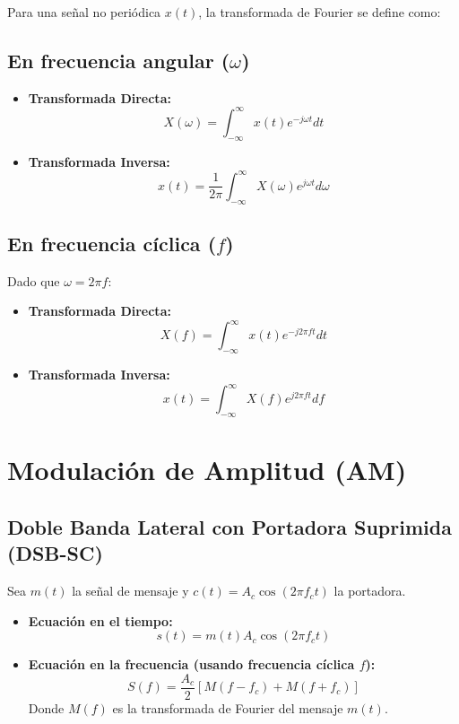 \documentclass{article}
\begin{document}
Para una señal no periódica $x(t)$, la transformada de Fourier se define como:

\subsection{En frecuencia angular ($\omega$)}
\begin{itemize}
      \item \textbf{Transformada Directa:}
            \[ X(\omega) = \int_{-\infty}^{\infty} x(t) e^{-j\omega t} dt \]
      \item \textbf{Transformada Inversa:}
            \[ x(t) = \frac{1}{2\pi} \int_{-\infty}^{\infty} X(\omega) e^{j\omega t} d\omega \]
\end{itemize}

\subsection{En frecuencia cíclica ($f$)}
Dado que $\omega = 2\pi f$:
\begin{itemize}
      \item \textbf{Transformada Directa:}
            \[ X(f) = \int_{-\infty}^{\infty} x(t) e^{-j2\pi f t} dt \]
      \item \textbf{Transformada Inversa:}
            \[ x(t) = \int_{-\infty}^{\infty} X(f) e^{j2\pi f t} df \]
\end{itemize}

\section{Modulación de Amplitud (AM)}

\subsection{Doble Banda Lateral con Portadora Suprimida (DSB-SC)}

Sea $m(t)$ la señal de mensaje y $c(t) = A_c \cos(2\pi f_c t)$ la portadora.

\begin{itemize}
      \item \textbf{Ecuación en el tiempo:}
            \[ s(t) = m(t) A_c \cos(2\pi f_c t) \]
            
      \item \textbf{Ecuación en la frecuencia (usando frecuencia cíclica $f$):}
            \[ S(f) = \frac{A_c}{2} [M(f - f_c) + M(f + f_c)] \]
            Donde $M(f)$ es la transformada de Fourier del mensaje $m(t)$.
\end{itemize}
\end{document}
